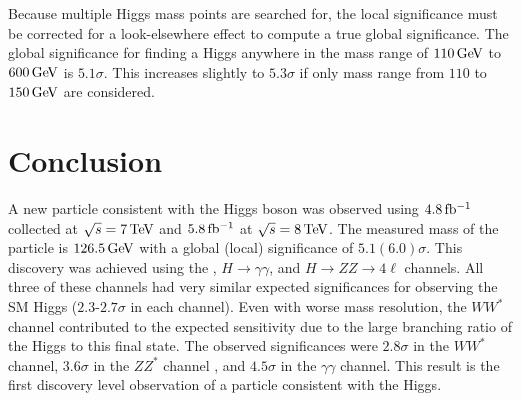 Because multiple Higgs mass points are searched for, the local significance must be corrected for a look-elsewhere effect to compute a true global significance. The global significance for finding a Higgs anywhere in the mass range of $110 \GeV$ to $600 \GeV$ is $5.1\sigma$. This increases slightly to $5.3\sigma$ if only mass range from $110$ to $150 \GeV$ are considered. 

\section{Conclusion}

A new particle consistent with the Higgs boson was observed using $4.8 \mbox{\,fb$^{-1}$}$ collected at $\sqrt{s} = 7 \TeV$ and $5.8 \mbox{\,fb$^{-1}$}$ at $\sqrt{s} = 8 \TeV$. The measured mass of the particle is $126.5 \GeV$ with a global (local) significance of $5.1 (6.0)\sigma$. This discovery was achieved using the \HWWfull, $H\to\gamma\gamma$, and $H\to ZZ\to 4\ell$ channels. All three of these channels had very similar expected significances for observing the SM Higgs ($2.3$-$2.7\sigma$ in each channel). Even with worse mass resolution, the $WW^*$ channel contributed to the expected sensitivity due to the large branching ratio of the Higgs to this final state. The observed significances were $2.8\sigma$ in the $WW^*$ channel, $3.6\sigma$ in the $ZZ^*$ channel , and $4.5\sigma$ in the $\gamma\gamma$ channel. This result is the first discovery level observation of a particle consistent with the Higgs. 

